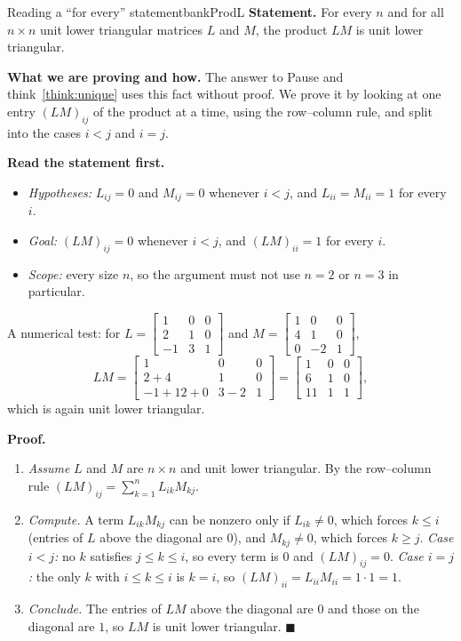 \documentclass[11pt]{article}
\begin{document}
\begin{exmp}{Reading a ``for every'' statement}{bankProdL}
\textbf{Statement.} For every $n$ and for all $n\times n$ unit lower triangular matrices $L$ and $M$, the product $LM$ is unit lower triangular.

\textbf{What we are proving and how.} The answer to Pause and think~\ref{think:unique} uses this fact without proof. We prove it by looking at one entry $(LM)_{ij}$ of the product at a time, using the row--column rule, and split into the cases $i<j$ and $i=j$.

\textbf{Read the statement first.}
\begin{itemize}
  \item \emph{Hypotheses:} $L_{ij}=0$ and $M_{ij}=0$ whenever $i<j$, and $L_{ii}=M_{ii}=1$ for every $i$.
  \item \emph{Goal:} $(LM)_{ij}=0$ whenever $i<j$, and $(LM)_{ii}=1$ for every $i$.
  \item \emph{Scope:} every size $n$, so the argument must not use $n=2$ or $n=3$ in particular.
\end{itemize}
A numerical test: for $L=\begin{bmatrix}1&0&0\\2&1&0\\-1&3&1\end{bmatrix}$ and $M=\begin{bmatrix}1&0&0\\4&1&0\\0&-2&1\end{bmatrix}$,
\[
LM=\begin{bmatrix}1&0&0\\2+4&1&0\\-1+12+0&3-2&1\end{bmatrix}=\begin{bmatrix}1&0&0\\6&1&0\\11&1&1\end{bmatrix},
\]
which is again unit lower triangular.

\textbf{Proof.}
\begin{enumerate}[itemsep=2pt]
  \item \emph{Assume} $L$ and $M$ are $n\times n$ and unit lower triangular. By the row--column rule $(LM)_{ij}=\sum_{k=1}^{n}L_{ik}M_{kj}$.
  \item \emph{Compute.} A term $L_{ik}M_{kj}$ can be nonzero only if $L_{ik}\neq0$, which forces $k\le i$ (entries of $L$ above the diagonal are $0$), and $M_{kj}\neq0$, which forces $k\ge j$. \emph{Case $i<j$:} no $k$ satisfies $j\le k\le i$, so every term is $0$ and $(LM)_{ij}=0$. \emph{Case $i=j$:} the only $k$ with $i\le k\le i$ is $k=i$, so $(LM)_{ii}=L_{ii}M_{ii}=1\cdot1=1$.
  \item \emph{Conclude.} The entries of $LM$ above the diagonal are $0$ and those on the diagonal are $1$, so $LM$ is unit lower triangular. \qquad$\blacksquare$
\end{enumerate}


\end{exmp}
\end{document}
